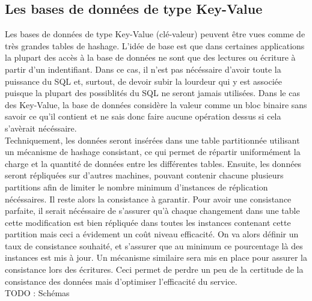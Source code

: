 \documentclass[11pt]{article}
\begin{document}
\subsection{Les bases de données de type Key-Value}
Les bases de données de type Key-Value (clé-valeur) peuvent être vues comme de très grandes tables de hashage. L'idée de base est que dans certaines applications la plupart des accès à la base de données ne sont que des lectures ou écriture à partir d'un indentifiant. Dans ce cas, il n'est pas nécéssaire d'avoir toute la puissance du SQL et, surtout, de devoir subir la lourdeur qui y est associée puisque la plupart des possiblités du SQL ne seront jamais utilisées. Dans le cas des Key-Value, la base de données considère la valeur comme un bloc binaire sans savoir ce qu'il contient et ne sais donc faire aucune opération dessus si cela s'avèrait nécéssaire. \\
Techniquement, les données seront insérées dans une table partitionnée utilisant un mécanisme de hashage consistant, ce qui permet de répartir uniformément la charge et la quantité de données entre les différentes tables. Ensuite, les données seront répliquées sur d'autres machines, pouvant contenir chacune plusieurs partitions afin de limiter le nombre minimum d'instances de réplication nécéssaires. Il reste alors la consistance à garantir. Pour avoir une consistance parfaite, il serait nécéssaire de s'assurer qu'à chaque changement dans une table cette modification est bien répliquée dans toutes les instances contenant cette partition mais ceci a évidement un coût niveau efficacité. On va alors définir un taux de consistance souhaité, et s'assurer que au minimum ce pourcentage là des instances est mis à jour. Un mécanisme similaire sera mis en place pour assurer la consistance lors des écritures. Ceci permet de perdre un peu de la certitude de la consistance des données mais d'optimiser l'efficacité du service. \\
TODO : Schémas
\end{document}
